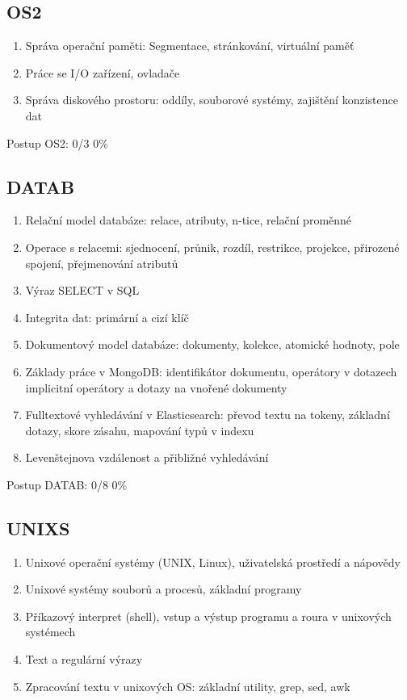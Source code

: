 \documentclass{article}
\begin{document}
	\subsection*{OS2}
	
	\begin{enumerate}[label=\arabic*.]
		\item Správa operační paměti: Segmentace, stránkování, virtuální paměť 
		\item Práce se I/O zařízení, ovladače
		\item Správa diskového prostoru: oddíly, souborové systémy, zajištění konzistence dat
	\end{enumerate}
	
	Postup OS2: 0/3 0\%
	
	\subsection*{DATAB}
	
	\begin{enumerate}[label=\arabic*.]
		\item Relační model databáze: relace, atributy, n-tice, relační proměnné
		\item Operace s relacemi: sjednocení, průnik, rozdíl, restrikce, projekce, přirozené spojení, přejmenování atributů
		\item Výraz SELECT v SQL
		\item Integrita dat: primární a cizí klíč
		\item Dokumentový model databáze: dokumenty, kolekce, atomické hodnoty, pole
		\item Základy práce v MongoDB: identifikátor dokumentu, operátory v dotazech implicitní operátory a dotazy na vnořené dokumenty
		\item Fulltextové vyhledávání v Elasticsearch: převod textu na tokeny, základní dotazy, skore zásahu, mapování typů v indexu
		\item Levenštejnova vzdálenost a přibližné vyhledávání
	\end{enumerate}
	
	Postup DATAB: 0/8 0\%
	
	\subsection*{UNIXS}
	
	\begin{enumerate}[label=\arabic*.]
		\item Unixové operační systémy (UNIX, Linux), uživatelská prostředí a nápovědy
		\item Unixové systémy souborů a procesů, základní programy
		\item Příkazový interpret (shell), vstup a výstup programu a roura v unixových systémech
		\item Text a regulární výrazy
		\item Zpracování textu v unixových OS: základní utility, grep, sed, awk
	\end{enumerate}
	
\end{document}
